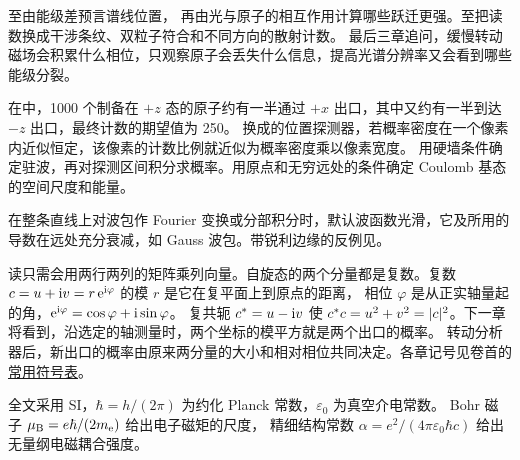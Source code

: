 至由能级差预言谱线位置，
再由光与原子的相互作用计算哪些跃迁更强。至把读数换成干涉条纹、双粒子符合和不同方向的散射计数。
最后三章追问，缓慢转动磁场会积累什么相位，只观察原子会丢失什么信息，提高光谱分辨率又会看到哪些能级分裂。

在中，1000 个制备在 $+z$ 态的原子约有一半通过 $+x$ 出口，其中又约有一半到达 $-z$ 出口，最终计数的期望值为 250。
换成的位置探测器，若概率密度在一个像素内近似恒定，该像素的计数比例就近似为概率密度乘以像素宽度。
用硬墙条件确定驻波，再对探测区间积分求概率。用原点和无穷远处的条件确定 Coulomb 基态的空间尺度和能量。

在整条直线上对波包作 Fourier 变换或分部积分时，默认波函数光滑，它及所用的导数在远处充分衰减，如 Gauss 波包。带锐利边缘的反例见。

读只需会用两行两列的矩阵乘列向量。自旋态的两个分量都是复数。复数 $c = u + \mathrm{i} v = r\mathop{}\!\mathrm{e}^{\mathrm{i}\varphi}$ 的模 $r$ 是它在复平面上到原点的距离，
相位 $\varphi$ 是从正实轴量起的角，$\mathop{}\!\mathrm{e}^{\mathrm{i}\varphi} = \cos\varphi + \mathrm{i}\sin\varphi$。
复共轭 $c^\ast = u - \mathrm{i} v$ 使 $c^\ast c = u^2 + v^2 = \lvert c\rvert^2$。下一章将看到，沿选定的轴测量时，两个坐标的模平方就是两个出口的概率。
转动分析器后，新出口的概率由原来两分量的大小和相对相位共同决定。各章记号见卷首的\hyperref[chap:symbols]{常用符号表}。

全文采用 SI，$\hbar = h/(2\pi)$ 为约化 Planck 常数，$\varepsilon_0$ 为真空介电常数。
Bohr 磁子 $\mu_{\mathrm{B}} = e\hbar/(2m_{\mathrm{e}})$ 给出电子磁矩的尺度，
精细结构常数 $\alpha = e^2/(4\pi\varepsilon_0\hbar c)$ 给出无量纲电磁耦合强度。

